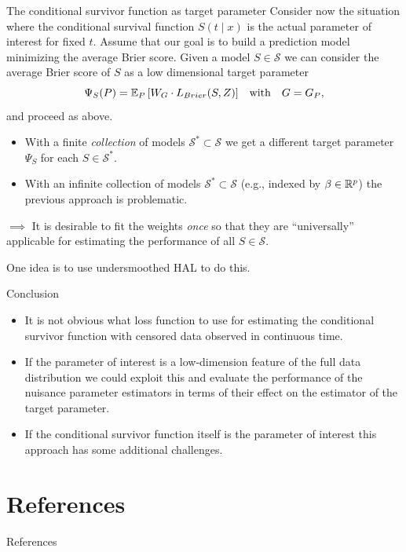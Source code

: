 \documentclass[smaller]{beamer}\usepackage{listings}
\begin{document}
\begin{frame}[label={sec:orgf4cd749}]{The conditional survivor function as target parameter}
\small Consider now the situation where the conditional survival function \(S(t \mid x)\) is the
actual parameter of interest for fixed \(t\). Assume that our goal is to build a prediction model
minimizing the average Brier score. Given a model \(S \in \mathcal{S}\) we can consider the average
Brier score of \(S\) as a low dimensional target parameter
\begin{equation*}
  \Psi_S(P) = \operatorname{\mathbb{E}}_P{\left[ W_G \cdot L_{Brier}(S, Z) \right]}
  \quad \text{with} \quad G = G_P,
\end{equation*}
and proceed as above. \pause

\begin{itemize}
\item With a finite \emph{collection} of models \(\mathcal{S}^* \subset \mathcal{S}\) we get a different target parameter
\(\Psi_S\) for each \(S \in\mathcal{S}^*\). \pause
\item With an infinite collection of models \(\mathcal{S}^* \subset \mathcal{S}\) (e.g., indexed by
\(\beta \in \mathbb{R}^p\)) the previous approach is problematic. \pause
\end{itemize}

\(\implies\) It is desirable to fit the weights \emph{once} so that they are ``universally''
applicable for estimating the performance of all \(S \in \mathcal{S}\).

\vfill

One idea is to use undersmoothed HAL to do this.
\end{frame}

\begin{frame}[label={sec:orgc264535}]{Conclusion}
\begin{itemize}
\item It is not obvious what loss function to use for estimating the conditional survivor function with
censored data observed in continuous time.
\item If the parameter of interest is a low-dimension feature of the full data distribution we could
exploit this and evaluate the performance of the nuisance parameter estimators in terms of their
effect on the estimator of the target parameter.
\item If the conditional survivor function itself is the parameter of interest this approach has some
additional challenges.
\end{itemize}
\end{frame}

\section*{References}
\label{sec:org7cef444}
\begin{frame}[label={sec:orgb283cd5}]{References}
\footnotesize 
\end{frame}
\end{document}

